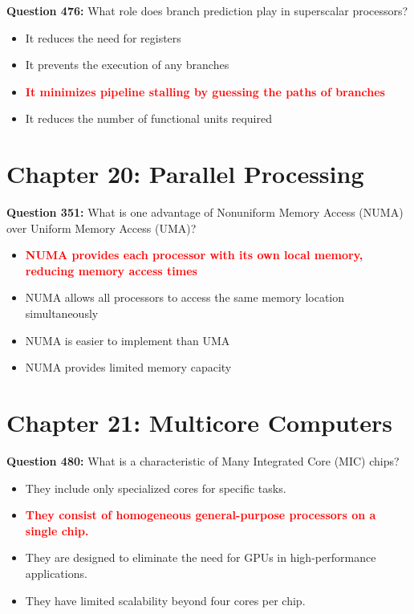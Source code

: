 \documentclass[12pt,a4paper]{article}
\begin{document}
\textbf{Question 476:} What role does branch prediction play in superscalar processors?

\begin{itemize}
    \item[\textbf{A.}] It reduces the need for registers
    \item[\textbf{B.}] It prevents the execution of any branches
    \item[\textbf{C.}] \textcolor{red}{\textbf{It minimizes pipeline stalling by guessing the paths of branches}}
    \item[\textbf{D.}] It reduces the number of functional units required
\end{itemize}

\vspace{0.5cm}

\section{Chapter 20: Parallel Processing}

\textbf{Question 351:} What is one advantage of Nonuniform Memory Access (NUMA) over Uniform Memory Access (UMA)?

\begin{itemize}
    \item[\textbf{A.}] \textcolor{red}{\textbf{NUMA provides each processor with its own local memory, reducing memory access times}}
    \item[\textbf{B.}] NUMA allows all processors to access the same memory location simultaneously
    \item[\textbf{C.}] NUMA is easier to implement than UMA
    \item[\textbf{D.}] NUMA provides limited memory capacity
\end{itemize}

\vspace{0.5cm}

\section{Chapter 21: Multicore Computers}

\textbf{Question 480:} What is a characteristic of Many Integrated Core (MIC) chips?

\begin{itemize}
    \item[\textbf{A.}] They include only specialized cores for specific tasks.
    \item[\textbf{B.}] \textcolor{red}{\textbf{They consist of homogeneous general-purpose processors on a single chip.}}
    \item[\textbf{C.}] They are designed to eliminate the need for GPUs in high-performance applications.
    \item[\textbf{D.}] They have limited scalability beyond four cores per chip.
\end{itemize}

\vspace{0.5cm}
\end{document}
